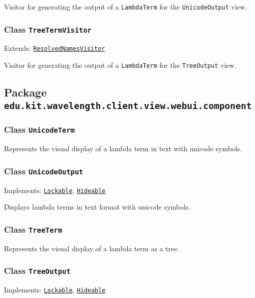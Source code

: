 Visitor for generating the output of a \texttt{LambdaTerm} for the \texttt{UnicodeOutput} view.

\subsubsection{Class \texttt{TreeTermVisitor}}
\label{type:edu.kit.wavelength.client.view.update.TreeTermVisitor}
Extends: \texttt{\hyperref[type:edu.kit.wavelength.client.model.term.ResolvedNamesVisitor]{ResolvedNamesVisitor}}

Visitor for generating the output of a \texttt{LambdaTerm} for the \texttt{TreeOutput} view.

\subsection{Package \lstinline{edu.kit.wavelength.client.view.webui.component}}
\label{pkg:edu.kit.wavelength.client.view.webui.component}


\subsubsection{Class \texttt{UnicodeTerm}}
\label{type:edu.kit.wavelength.client.view.webui.component.UnicodeTerm}
Represents the visual display of a lambda term in text with unicode symbols.

\subsubsection{Class \texttt{UnicodeOutput}}
\label{type:edu.kit.wavelength.client.view.webui.component.UnicodeOutput}
Implements: \texttt{\hyperref[type:edu.kit.wavelength.client.view.api.Lockable]{Lockable}}, \texttt{\hyperref[type:edu.kit.wavelength.client.view.api.Hideable]{Hideable}}

Displays lambda terms in text format with unicode symbols.

\subsubsection{Class \texttt{TreeTerm}}
\label{type:edu.kit.wavelength.client.view.webui.component.TreeTerm}
Represents the visual display of a lambda term as a tree.

\subsubsection{Class \texttt{TreeOutput}}
\label{type:edu.kit.wavelength.client.view.webui.component.TreeOutput}
Implements: \texttt{\hyperref[type:edu.kit.wavelength.client.view.api.Lockable]{Lockable}}, \texttt{\hyperref[type:edu.kit.wavelength.client.view.api.Hideable]{Hideable}}

